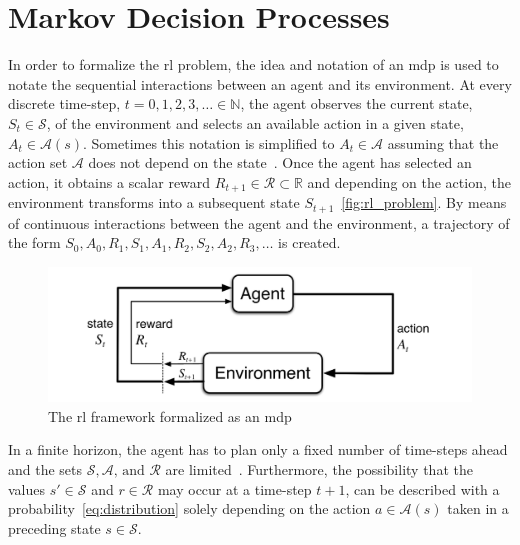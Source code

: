 \documentclass[draft,final]{vutinfth} %
\newcommand{\p}[1]{see p. #1}
\begin{document}
    \section{Markov Decision Processes}\label{sec:markov-decision-processes}
    In order to formalize the \gls{rl} problem, the idea and notation of an \gls{mdp} is used to notate the sequential interactions between an agent and its environment.
    At every discrete time-step, $t = 0,1,2,3, \ldots \in \mathbb{N}$, the agent observes the current state, $S_t \in \mathcal{S}$, of the environment and selects an available action in a given state, $A_t \in \mathcal{A}(s)$.
    Sometimes this notation is simplified to $A_t \in \mathcal{A}$ assuming that the action set $\mathcal{A}$ does not depend on the state~\citep[\p{48}]{sutton_reinforcement_2018}.
    Once the agent has selected an action, it obtains a scalar reward $R_{t+1} \in \mathcal{R} \subset \mathbb{R}$ and depending on the action, the environment transforms into a subsequent state $S_{t+1}$~\eqref{fig:rl_problem}.
    By means of continuous interactions between the agent and the environment, a trajectory of the form $S_0,A_0,R_1,S_1,A_1,R_2,S_2,A_2,R_3,\ldots$ is created.

    \begin{figure}[h]
        \centering
        \includegraphics[width=\textwidth]{figures/rl_problem.png}
        \caption[The \acrlong{rl} framework formalized as a \acrlong{mdp}]{The \gls{rl} framework formalized as an \gls{mdp}\protect\footnotemark}
        \label{fig:rl_problem}
    \end{figure}

    \footnotetext{\cite[\p{48}]{sutton_reinforcement_2018}}

    In a finite horizon, the agent has to plan only a fixed number of time-steps ahead and the sets $\mathcal{S},\mathcal{A}\text{, and }\mathcal{R}$ are limited~\citep[\p{47f}]{sutton_reinforcement_2018,kaelbling_reinforcement_1996}.
    Furthermore, the possibility that the values $s'\in \mathcal{S}$ and $r \in \mathcal{R}$ may occur at a time-step $t+1$, can be described with a probability~\eqref{eq:distribution} solely depending on the action $a \in \mathcal{A}(s)$ taken in a preceding state $s \in \mathcal{S}$.
\end{document}
